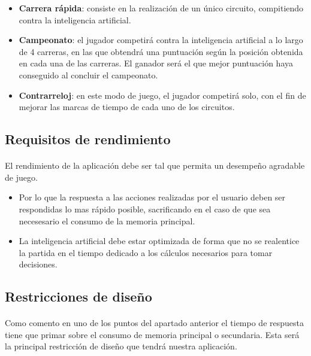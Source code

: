 \begin{itemize}
	\item \textbf{Carrera rápida}: consiste en la realización de un único circuito, compitiendo contra la inteligencia artificial.
	\item \textbf{Campeonato}: el jugador competirá contra la inteligencia artificial a lo largo de 4 carreras, en las que obtendrá una puntuación
	según la posición obtenida en cada una de las carreras. El ganador será el que mejor puntuación haya conseguido al concluir
	el campeonato.
	\item \textbf{Contrarreloj}: en este modo de juego, el jugador competirá solo, con el fin de mejorar las marcas de tiempo de cada uno de los 
	circuitos.
\end{itemize}


\subsection{Requisitos de rendimiento}

\paragraph{}
El rendimiento de la aplicación debe ser tal que permita un desempeño agradable de juego. 

\begin{itemize}
    \item Por lo que la respuesta a las acciones realizadas por el usuario deben ser respondidas lo mas rápido posible,
    sacrificando en el caso de que sea necesesario el consumo de la memoria principal.
    
    \item La inteligencia artificial debe estar optimizada de forma que no se realentice la partida en el tiempo dedicado a los
    cálculos necesarios para tomar decisiones.
\end{itemize}
    

\subsection{Restricciones de diseño}

\paragraph{}
Como comento en uno de los puntos del apartado anterior el tiempo de respuesta tiene que primar sobre el consumo de 
memoria principal o secundaria. Esta será la principal restricción de diseño que tendrá nuestra aplicación.

